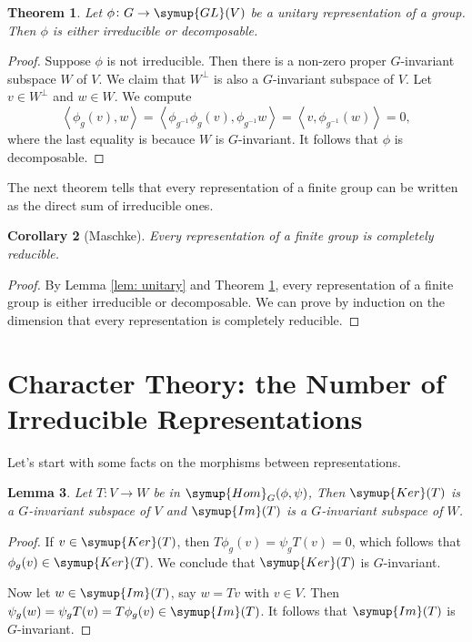 \documentclass{assignment}[2019/10/15]
\newcommand{\lr}[3]{\left#1#3\right#2}
\theoremstyle{plain}
\newtheorem{theorem}{Theorem}[section]
\newtheorem{lemma}[theorem]{Lemma}
\newtheorem{corollary}[theorem]{Corollary}
\newcommand{\Kernal}{\mathop{}\!\symup{Ker}}
\newcommand{\Image}{\mathop{}\!\symup{Im}}
\newcommand{\Hom}{\mathop{}\!\symup{Hom}}
\newcommand{\GL}{\mathop{}\!\symup{GL}}
\numberwithin{equation}{section}
\begin{document}
    \begin{theorem}\label{thm: decom}
        Let $\phi\colon G\to \GL(V)$ be a unitary representation of a group. Then $\phi$ is either irreducible or decomposable.
    \end{theorem}

    \begin{proof}
        Suppose $\phi$ is not irreducible. Then there is a non-zero proper $G$-invariant subspace $W$ of $V$. We claim that $W^\perp$ is also a $G$-invariant subspace of $V$. Let $v\in W^\perp$ and $w\in W$. We compute
        \begin{equation}
            \lr<>{\phi_g(v), w} = \lr<>{\phi_{g^{-1}}\phi_g(v), \phi_{g^{-1}}w} = \lr<>{v, \phi_{g^{-1}}(w)} = 0,
        \end{equation}
        where the last equality is becauce $W$ is $G$-invariant. It follows that $\phi$ is decomposable.
    \end{proof}

    The next theorem tells that every representation of a finite group can be written as the direct sum of irreducible ones.

    \begin{corollary}[Maschke]
        Every representation of a finite group is completely reducible.
    \end{corollary}

    \begin{proof}
        By Lemma \ref{lem: unitary} and Theorem \ref{thm: decom}, every representation of a finite group is either irreducible or decomposable. We can prove by induction on the dimension that every representation is completely reducible.
    \end{proof}

    \section{Character Theory: the Number of Irreducible Representations}

    Let's start with some facts on the morphisms between representations.

    \begin{lemma}
        Let $T\colon V\to W$ be in $\Hom_G(\phi, \psi)$, Then $\Kernal(T)$ is a $G$-invariant subspace of $V$ and $\Image(T)$ is a $G$-invariant subspace of $W$.
    \end{lemma}

    \begin{proof}
        If $v\in \Kernal(T)$, then $T\phi_g(v)=\psi_gT(v)=0$, which follows that $\phi_g(v)\in\Kernal(T)$. We conclude that $\Kernal(T)$ is $G$-invariant.

        Now let $w\in\Image(T)$, say $w=Tv$ with $v\in V$. Then $\psi_g(w) =\psi_gT(v) = T\phi_g(v)\in \Image(T)$. It follows that $\Image(T)$ is $G$-invariant.
    \end{proof}
\end{document}
